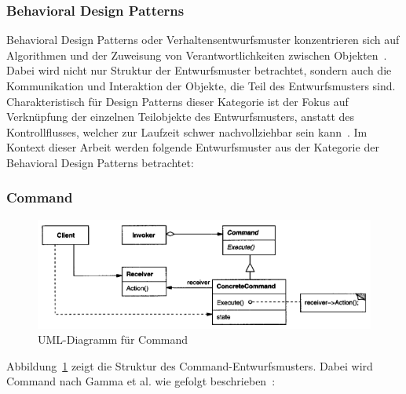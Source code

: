 \pagebreak

\subsubsection{Behavioral Design Patterns}

Behavioral Design Patterns oder Verhaltensentwurfsmuster konzentrieren sich auf Algorithmen und der Zuweisung von Verantwortlichkeiten zwischen Objekten~\cite[S. 221]{gamma1994design}.
Dabei wird nicht nur Struktur der Entwurfsmuster betrachtet, sondern auch die Kommunikation und Interaktion der Objekte, die Teil des Entwurfsmusters sind. Charakteristisch für Design Patterns dieser Kategorie ist der Fokus auf Verknüpfung der einzelnen Teilobjekte des Entwurfsmusters,
anstatt des Kontrollflusses, welcher zur Laufzeit schwer nachvollziehbar sein kann~\cite[S. 221]{gamma1994design}.
Im Kontext dieser Arbeit werden folgende Entwurfsmuster aus der Kategorie der Behavioral Design Patterns betrachtet:

\subsubsection{Command}

\begin{figure}[h]
    \centering
    \includegraphics[scale=0.75]{figures/command.png}
    \caption{UML-Diagramm für Command}
    \label{fig:command}
\end{figure}

Abbildung~\ref{fig:command} zeigt die Struktur des Command-Entwurfsmusters. 
Dabei wird Command nach Gamma et al. wie gefolgt beschrieben~\cite[S. 236]{gamma1994design}:

